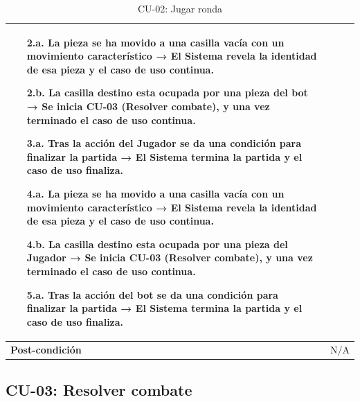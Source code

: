 \begin{table}[H]
\begin{tabular}{|p{3cm}|p{14cm}|}
\begin{itemize}[nosep, before=\vspace{-0.4\baselineskip}]
			\item [{2.a.}] La pieza se ha movido a una casilla vacía con un movimiento característico → El Sistema revela la identidad de esa pieza y el caso de uso continua.
			\item [{2.b.}] La casilla destino esta ocupada por una pieza del bot → Se inicia CU-03 (Resolver combate), y una vez terminado el caso de uso continua.
			\item [{3.a.}] Tras la acción del Jugador se da una condición para finalizar la partida → El Sistema termina la partida y el caso de uso finaliza.
			\item [{4.a.}] La pieza se ha movido a una casilla vacía con un movimiento característico → El Sistema revela la identidad de esa pieza y el caso de uso continua.
			\item [{4.b.}] La casilla destino esta ocupada por una pieza del Jugador → Se inicia CU-03 (Resolver combate), y una vez terminado el caso de uso continua.
			\item [{5.a.}] Tras la acción del bot se da una condición para finalizar la partida → El Sistema termina la partida y el caso de uso finaliza.
		\end{itemize} \\
		\hline \textbf{Post-condición} & N/A \\
		\hline
	\end{tabular}
	\caption{CU-02: Jugar ronda}
	\label{tab:cu02}
\end{table}

\clearpage


\subsection{CU-03: Resolver combate}

